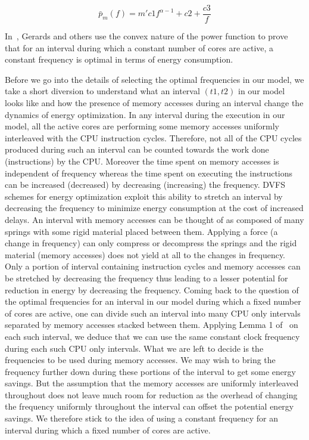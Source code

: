 \documentclass[11pt, letterpaper]{article}
\begin{document}
\begin{equation}\label{EnergyPerCycleEquation}
 \bar{p}_m(f) = m'c1f^{\alpha-1} + c2 + \frac{c3}{f}
\end{equation}

In~\cite{ConvexAndScheduling}, Gerards and others use the convex nature of the power function to prove that for an interval during which a constant number of cores are active, a constant frequency is optimal in terms of energy consumption. 


Before we go into the details of selecting the optimal frequencies in our model, we take a short diversion to understand what an interval $(t1,t2)$ in our model looks like and how the presence of  memory accesses during an interval change the dynamics of energy optimization. In any interval during the execution in our model, all the active cores are performing some memory accesses uniformly interleaved with the CPU instruction cycles. Therefore, not all of the CPU cycles produced during such an interval can be counted towards the work done (instructions) by the CPU. Moreover the time spent on memory accesses is independent of frequency whereas the time spent on executing the instructions can be increased (decreased) by decreasing (increasing) the frequency.  DVFS schemes for energy optimization exploit this ability to stretch an interval by decreasing the frequency to minimize energy consumption at the cost of increased delays. An interval with memory accesses can be thought of as composed of many springs with some rigid material placed between them. Applying a force (a change in frequency) can only compress or decompress the springs and the rigid material (memory accesses) does not yield at all to the changes in frequency. Only a portion of interval containing instruction cycles and memory accesses can be stretched by decreasing the frequency thus leading to a lesser potential for reduction in energy by decreasing the frequency. Coming back to the question of the optimal frequencies for an interval in our model during which a fixed number of cores are active, one can divide such an interval into many CPU only intervals separated by memory accesses stacked between them. Applying Lemma 1 of~\cite{ConvexAndScheduling} on each such interval, we deduce that we can use the same constant clock frequency during each such CPU only intervals. What we are left to decide is the frequencies to be used during memory accesses. We may wish to bring the frequency further down during these portions of the interval to get some energy savings. But the assumption that the memory accesses are uniformly interleaved throughout does not leave much room for reduction as the overhead of changing the frequency uniformly throughout the interval can offset the potential energy savings. We therefore stick to the idea of using a constant frequency for an interval during which a fixed number of cores are active.
\end{document}

